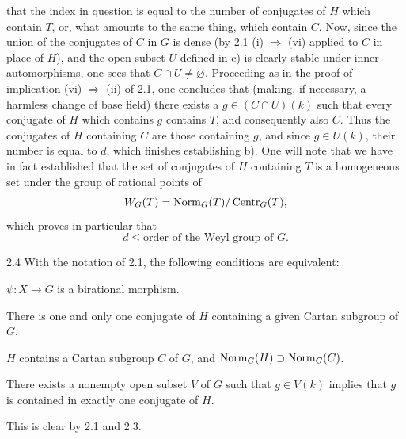 that the index in question is equal to the number of conjugates of $H$
which contain $T$, or, what amounts to the same thing, which contain $C$.
Now, since the union of the conjugates of $C$ in $G$ is dense (by
2.1 (i) $\Rightarrow$ (vi) applied to $C$ in place of $H$), and the open
subset $U$ defined in c) is clearly stable under inner automorphisms,
one sees that $C\cap U\ne\varnothing$. Proceeding as in the proof of
implication (vi) $\Rightarrow$ (ii) of 2.1, one concludes that (making,
if necessary, a harmless change of base field) there exists a
$g\in(C\cap U)(k)$ such that every conjugate of $H$ which contains $g$
contains $T$, and consequently also $C$. Thus the conjugates of $H$
containing $C$ are those containing $g$, and since $g\in U(k)$, their
number is equal to $d$, which finishes establishing b). One will note
that we have in fact established that the set of conjugates of $H$
containing $T$ is a homogeneous set under the group of rational points of
\[
 W_G(T)=\operatorname{Norm}_G(T)/\operatorname{Centr}_G(T),
\]
which proves in particular that
\[
 d\leq\text{order of the Weyl group of }G.
\]

\begin{corollary}{2.4}\label{XIII.2.4}
With the notation of 2.1, the following conditions are equivalent:
\begin{enumeratei}
\item $\psi:X\to G$ is a birational morphism.
\item There is one and only one conjugate of $H$ containing a given
Cartan subgroup of $G$.
\item $H$ contains a Cartan subgroup $C$ of $G$, and
$\operatorname{Norm}_G(H)\supset\operatorname{Norm}_G(C)$.
\item There exists a nonempty open subset $V$ of $G$ such that
$g\in V(k)$ implies that $g$ is contained in exactly one conjugate of $H$.
\end{enumeratei}
\end{corollary}
This is clear by 2.1 and 2.3.

